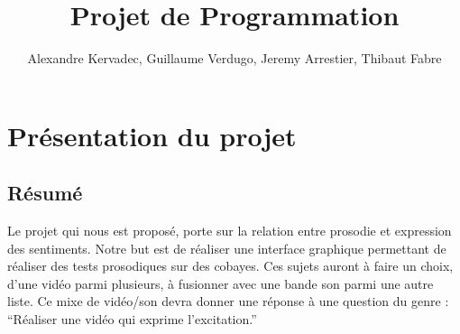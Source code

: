 \documentclass[a4paper,twoside,10pt]{report}
\begin{document}
\pagestyle{empty} %



\title{Projet de Programmation}
\author{Alexandre Kervadec, Guillaume Verdugo, Jeremy Arrestier, Thibaut Fabre}
\maketitle



\tableofcontents %
\cleardoublepage %

\pagestyle{plain} %







\chapter{Présentation du projet}\label{resume_projet}

\section{Résumé}

Le projet qui nous est proposé, porte sur la relation entre prosodie et expression des sentiments. Notre but est de réaliser une interface graphique permettant de réaliser des tests prosodiques sur des cobayes.
Ces sujets auront à faire un choix, d’une vidéo parmi plusieurs, à fusionner avec une bande son parmi une autre liste.
Ce mixe de vidéo/son devra donner une réponse à une question du genre : “Réaliser une vidéo qui exprime l’excitation.”
\end{document}
